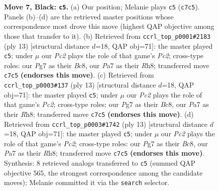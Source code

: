 \documentclass[11pt]{article}
\begin{document}
\begin{figure}[p]
\caption{\textbf{Move 7, Black: \texttt{c5}.} (a) Our position; Melanie plays \texttt{c5} (\texttt{c7c5}). Panels (b)--(d) are the retrieved master positions whose correspondence most drove this move (highest QAP objective among those that transfer to it). (b) Retrieved from \texttt{ccrl\_top\_p0001\#2183} (ply 13) [structural distance $d$=18, QAP obj=71]: the master played \texttt{c5}; under $\mu$ our \emph{Pc2} plays the role of that game's \emph{Pc2}; cross-type roles: our \emph{P}g7 as their \emph{B}c8, our \emph{P}a7 as their \emph{R}h8; transferred move \texttt{c7c5} \textbf{(endorses this move)}. (c) Retrieved from \texttt{ccrl\_top\_p0003\#137} (ply 13) [structural distance $d$=18, QAP obj=71]: the master played \texttt{c5}; under $\mu$ our \emph{Pc2} plays the role of that game's \emph{Pc2}; cross-type roles: our \emph{P}g7 as their \emph{B}c8, our \emph{P}a7 as their \emph{R}h8; transferred move \texttt{c7c5} \textbf{(endorses this move)}. (d) Retrieved from \texttt{ccrl\_top\_p0003\#1742} (ply 13) [structural distance $d$=18, QAP obj=71]: the master played \texttt{c5}; under $\mu$ our \emph{Pc2} plays the role of that game's \emph{Pc2}; cross-type roles: our \emph{P}g7 as their \emph{B}c8, our \emph{P}a7 as their \emph{R}h8; transferred move \texttt{c7c5} \textbf{(endorses this move)}. Synthesis: 8 retrieved analogs transferred to \texttt{c5} (summed QAP objective 565, the strongest correspondence among the candidate moves); Melanie committed it via the \texttt{search} selector.}
\label{fig:thought-m13}
\end{figure}

\clearpage
\end{document}
